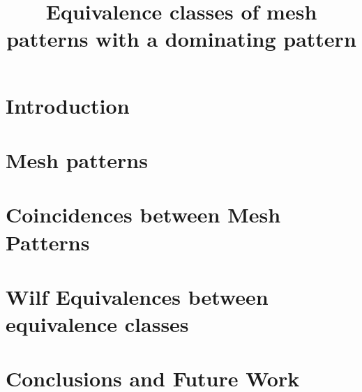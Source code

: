 \documentclass[11pt, a4paper]{amsart}
\title{Equivalence classes of mesh patterns with a dominating pattern}
\begin{document}

\maketitle
\thispagestyle{empty}
\section{Introduction}

\section{Mesh patterns}

\section{Coincidences between Mesh Patterns}
\label{sec:coincs}

\section{Wilf Equivalences between equivalence classes}

\section{Conclusions and Future Work}


\printbibliography
\end{document}
